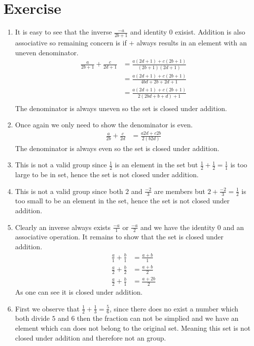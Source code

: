 \documentclass{article}
\begin{document}
\section{Exercise}
\begin{enumerate}[label=(\alph*)]
    \item It is easy to see that the inverse $\frac{-a}{2b + 1}$ and identity
    $0$ exisist. Addition is also associative so remaining concern is if $+$
    always results in an element with an uneven denominator.
    \begin{align*}
        \frac{a}{2b + 1} + \frac{c}{2d + 1} &= \frac{a(2d + 1) +  c(2b + 1)}{(2b + 1)(2d + 1)} \\
        &= \frac{a(2d + 1) +  c(2b + 1)}{4bd + 2b + 2d + 1} \\
        &= \frac{a(2d + 1) +  c(2b + 1)}{2(2bd + b + d) + 1} \\ 
    \end{align*}
    The denominator is always uneven so the set is closed under addition.
    \item Once again we only need to show the denominator is even.
    \begin{align*}
        \frac{a}{2b} + \frac{c}{2d} &= \frac{a2d +  c2b}{2(b2d)} 
    \end{align*}
    The denominator is always even so the set is closed under addition.
    \item This is not a valid group since $\frac{1}{2}$ is an element in the set
    but $\frac{1}{2} + \frac{1}{2} = \frac{1}{1}$ is too large to be in set,
    hence the set is not closed under addition.
    \item This is not a valid group since both $2$ and $\frac{-2}{3}$ are
    members but $2 + \frac{-2}{3} = \frac{1}{2}$ is too small to be an element
    in the set, hence the set is not closed under addition.
    \item Clearly an inverse always exists $\frac{-a}{1}$ or $\frac{-a}{2}$ and
    we have the identity $0$ and an associative operation. It remains to show
    that the set is closed under addition. 
    \begin{align*}
        \frac{a}{1} + \frac{b}{1} &= \frac{a + b}{1} \\
        \frac{a}{2} + \frac{b}{2} &= \frac{a + b}{2} \\
        \frac{a}{2} + \frac{b}{1} &= \frac{a + 2b}{2}
    \end{align*}
    As one can see it is closed under addition.
    \item First we observe that $\frac{1}{2} + \frac{1}{3} = \frac{5}{6}$, since
    there does no exist a number which both divide $5$ and $6$ then the fraction
    can not be simplied and we have an element which can does not belong to the
    original set. Meaning this set is not closed under addition and therefore
    not an group.
\end{enumerate}
\end{document}
